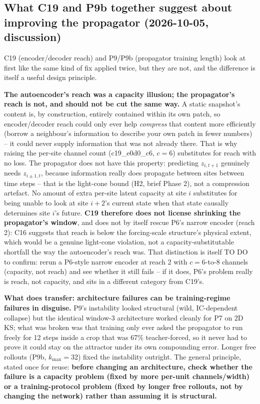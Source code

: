 \documentclass[11pt]{article}
\begin{document}
\subsection{What C19 and P9b together suggest about improving the
propagator (2026-10-05, discussion)}
\label{sec:propagator_lessons}

C19 (encoder/decoder reach) and P9/P9b (propagator training length)
look at first like the same kind of fix applied twice, but they are
not, and the difference is itself a useful design principle.

\textbf{The autoencoder's reach was a capacity illusion; the
propagator's reach is not, and should not be cut the same way.} A
static snapshot's content is, by construction, entirely contained
within its own patch, so encoder/decoder reach could only ever help
\emph{compress} that content more efficiently (borrow a neighbour's
information to describe your own patch in fewer numbers) -- it could
never supply information that was not already there. That is why
raising the per-site channel count (c19\_e0d0\_c6, $c{=}6$) substitutes
for reach with no loss. The propagator does not have this property:
predicting $z_{i,t+1}$ genuinely needs $z_{i\pm1,t}$, because
information really does propagate between sites between time steps --
that is the light-cone bound (H2, brief Phase 2), not a
compression artefact. No amount of extra per-site latent capacity at
site $i$ substitutes for being unable to look at site $i{+}2$'s current
state when that state causally determines site $i$'s future.
\textbf{C19 therefore does not license shrinking the propagator's
window}, and does not by itself rescue P6's narrow encoder (reach 2):
C16 suggests that reach is below the forcing-scale structure's physical
extent, which would be a genuine light-cone violation, not a
capacity-substitutable shortfall the way the autoencoder's reach was.
That distinction is itself TO DO to confirm: rerun a P6-style narrow
encoder at reach 2 with $c{=}6$-to-8 channels (capacity, not reach) and
see whether it still fails -- if it does, P6's problem really is reach,
not capacity, and sits in a different category from C19's.

\textbf{What does transfer: architecture failures can be training-regime
failures in disguise.} P9's instability looked structural (wild,
IC-dependent collapse) but the identical window-3 architecture worked
cleanly for P7 on 2D KS; what was broken was that training only ever
asked the propagator to run freely for 12 steps inside a crop that was
67\% teacher-forced, so it never had to prove it could stay on the
attractor under its own compounding error. Longer free rollouts
(P9b, $k_{\max}{=}32$) fixed the instability outright. The general
principle, stated once for reuse: \textbf{before changing an
architecture, check whether the failure is a capacity problem (fixed by
more per-unit channels/width) or a training-protocol problem (fixed by
longer free rollouts, not by changing the network) rather than assuming
it is structural.}
\end{document}
